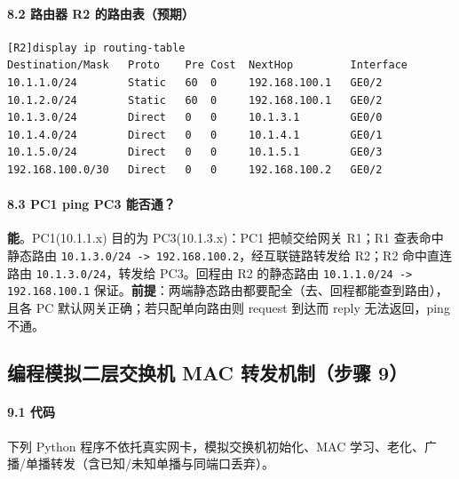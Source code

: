 \documentclass[12pt,a4paper]{article}
\begin{document}
\paragraph{8.2 路由器 R2 的路由表（预期）}
\begin{lstlisting}[style=cli]
[R2]display ip routing-table
Destination/Mask   Proto    Pre Cost  NextHop         Interface
10.1.1.0/24        Static   60  0     192.168.100.1   GE0/2
10.1.2.0/24        Static   60  0     192.168.100.1   GE0/2
10.1.3.0/24        Direct   0   0     10.1.3.1        GE0/0
10.1.4.0/24        Direct   0   0     10.1.4.1        GE0/1
10.1.5.0/24        Direct   0   0     10.1.5.1        GE0/3
192.168.100.0/30   Direct   0   0     192.168.100.2   GE0/2
\end{lstlisting}

\paragraph{8.3 PC1 ping PC3 能否通？}
\textbf{能}。PC1(10.1.1.x) 目的为 PC3(10.1.3.x)：PC1 把帧交给网关 R1；R1 查表命中静态路由 \texttt{10.1.3.0/24 -> 192.168.100.2}，经互联链路转发给 R2；R2 命中直连路由 \texttt{10.1.3.0/24}，转发给 PC3。回程由 R2 的静态路由 \texttt{10.1.1.0/24 -> 192.168.100.1} 保证。\textbf{前提}：两端静态路由都要配全（去、回程都能查到路由），且各 PC 默认网关正确；若只配单向路由则 request 到达而 reply 无法返回，ping 不通。

\subsection{编程模拟二层交换机 MAC 转发机制（步骤 9）}

\paragraph{9.1 代码}
下列 Python 程序不依托真实网卡，模拟交换机初始化、MAC 学习、老化、广播/单播转发（含已知/未知单播与同端口丢弃）。
\end{document}
